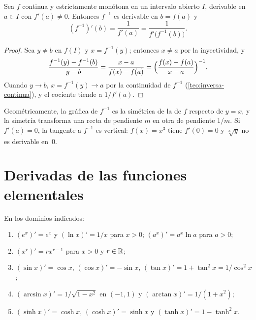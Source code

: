 \begin{teorema}\label{teo:inversa}
Sea $f$ continua y estrictamente monótona en un intervalo abierto $I$, derivable en $a\in I$ con $f'(a)\ne0$. Entonces $f^{-1}$ es derivable en $b=f(a)$ y
\[
(f^{-1})'(b)=\frac{1}{f'(a)}=\frac{1}{f'\bigl(f^{-1}(b)\bigr)}.
\]
\end{teorema}

\begin{proof}
Sea $y\ne b$ en $f(I)$ y $x=f^{-1}(y)$; entonces $x\ne a$ por la inyectividad, y
\[
\frac{f^{-1}(y)-f^{-1}(b)}{y-b}=\frac{x-a}{f(x)-f(a)}=\Bigl(\frac{f(x)-f(a)}{x-a}\Bigr)^{-1}.
\]
Cuando $y\to b$, $x=f^{-1}(y)\to a$ por la continuidad de $f^{-1}$ (\cref{teo:inversa-continua}), y el cociente tiende a $1/f'(a)$.
\end{proof}

Geométricamente, la gráfica de $f^{-1}$ es la simétrica de la de $f$ respecto de $y=x$, y la simetría transforma una recta de pendiente $m$ en otra de pendiente $1/m$. Si $f'(a)=0$, la tangente a $f^{-1}$ es vertical: $f(x)=x^{3}$ tiene $f'(0)=0$ y $\sqrt[3]{y}$ no es derivable en~0.

\section{Derivadas de las funciones elementales}

\begin{proposicion}\label{prop:tabla}
En los dominios indicados:
\begin{enumerate}
  \item $(e^{x})'=e^{x}$ y $(\ln x)'=1/x$ para $x>0$; $(a^{x})'=a^{x}\ln a$ para $a>0$;
  \item $(x^{r})'=rx^{r-1}$ para $x>0$ y $r\in\mathbb{R}$;
  \item $(\sin x)'=\cos x$, $(\cos x)'=-\sin x$, $(\tan x)'=1+\tan^{2}x=1/\cos^{2}x$;
  \item $(\arcsin x)'=1/\sqrt{1-x^{2}}$ en $(-1,1)$ y $(\arctan x)'=1/(1+x^{2})$;
  \item $(\sinh x)'=\cosh x$, $(\cosh x)'=\sinh x$ y $(\tanh x)'=1-\tanh^{2}x$.
\end{enumerate}
\end{proposicion}

